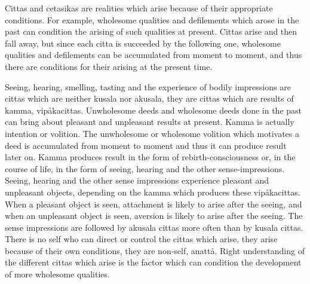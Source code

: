 \documentclass[12pt,twoside]{article}
\begin{document}
Cittas and cetasikas are realities which arise because of their
appropriate conditions. For example, wholesome qualities and
defilements which arose in the past can condition the arising of such
qualities at present. Cittas arise and then fall away, but since each
citta is succeeded by the following one, wholesome qualities and
defilements can be accumulated from moment to moment, and thus there
are conditions for their arising at the present time. 

Seeing, hearing, smelling, tasting and the experience of bodily
impressions are cittas which are neither kusala nor akusala, they are
cittas which are results of kamma, vip{\aa}kacittas. Unwholesome deeds
and wholesome deeds done in the past can bring about pleasant and
unpleasant results at present. Kamma is actually intention or volition.
The unwholesome or wholesome volition which motivates a deed is
accumulated from moment to moment and thus it can produce result later
on. Kamma produces result in the form of rebirth{}-consciousness or, in
the course of life, in the form of seeing, hearing and the other
sense{}-impressions. Seeing, hearing and the other sense impressions
experience pleasant and unpleasant objects, depending on the kamma
which produces these vip{\aa}kacittas. When a pleasant object is seen,
attachment is likely to arise after the seeing, and when an unpleasant
object is seen, aversion is likely to arise after the seeing. The sense
impressions are followed by akusala cittas more often than by kusala
cittas. There is no self who can direct or control the cittas which
arise, they arise because of their own conditions, they are non{}-self,
anatt{\aa}. Right understanding of the different cittas which arise is
the factor which can condition the development of more wholesome
qualities. 
\end{document}
